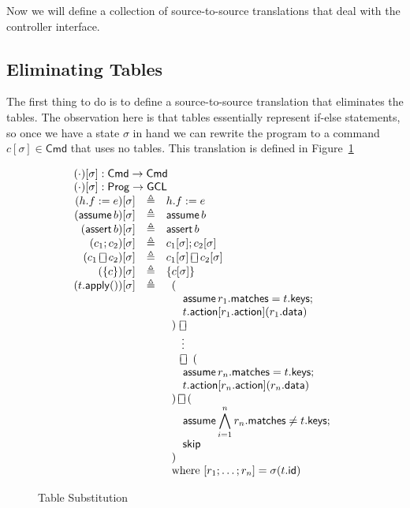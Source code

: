 \documentclass{article}
\newcommand{\Cmd}{\mathsf{Cmd}}
\newcommand{\Prog}{\mathsf{Prog}}
\newcommand{\GCL}{\mathsf{GCL}}
\newcommand{\matches}{\mathsf{matches}}
\newcommand{\action}{\mathsf{action}}
\newcommand{\keys}{\mathsf{keys}}
\newcommand{\data}{\mathsf{data}}
\newcommand{\id}{\mathsf{id}}
\newcommand{\assert}{\mathop{\mathsf{assert}}}
\newcommand{\assume}{\mathop{\mathsf{assume}}}
\newcommand{\apply}{\mathsf{apply}}
\newcommand{\choiceop}{\rotatebox[origin=c]{90}{$\sqsubset\!\!\!\sqsupset$}}
\newcommand{\choice}{\mathbin{\choiceop}}
\newcommand{\SKIP}{\mathsf{skip}}
\begin{document}
Now we will define a collection of source-to-source translations that deal with
the controller interface.

\subsection{Eliminating Tables}

The first thing to do is to define a source-to-source translation that
eliminates the tables. The observation here is that tables essentially represent
if-else statements, so once we have a state $\sigma$ in hand we can rewrite the
program to a command $c[\sigma] \in \Cmd$ that uses no tables. This translation
is defined in Figure~\ref{fig:table-elim}

\begin{figure}
  \[\begin{array}{r>{\triangleq}cl}
  \multicolumn{3}{l}{(\cdot)[\sigma] : \Cmd \to \Cmd} \\
  \multicolumn{3}{l}{(\cdot)[\sigma] : \Prog \to \GCL} \\
  (h.f := e)[\sigma] && h.f := e   \\
  (\assume b)[\sigma] && \assume b \\
  (\assert b)[\sigma] && \assert b \\
  (c_1;c_2)[\sigma] && c_1[\sigma];c_2[\sigma] \\
  (c_1 \choice c_2)[\sigma] && c_1[\sigma] \choice c_2[\sigma] \\
  (\{c\})[\sigma] && \{c[\sigma]\} \\
  (t.\apply())[\sigma] &&
  \begin{array}[t]{l}
    (\\
    \quad \assume {r_1.\matches = t.\keys};\\
    \quad t.\action[r_1.\action](r_1.\data)\\
    )~\choice\\
    \phantom)~\,\vdots\\
    \phantom)\,\choice~(\\
    \quad \assume {r_n.\matches = t.\keys};\\
    \quad t.\action[r_n.\action](r_n.\data)\\
    )\choice (\\
    \quad \displaystyle \assume {\bigwedge_{i=1}^n r_n.\matches \neq t.\keys};\\
    \quad \SKIP \\
    )\\
    \textrm{where}~[r_1;\ldots;r_n] = \sigma(t.\id)
  \end{array}
  \end{array}
  \]
  \caption{Table Substitution}
  \label{fig:table-elim}
\end{figure}
\end{document}
